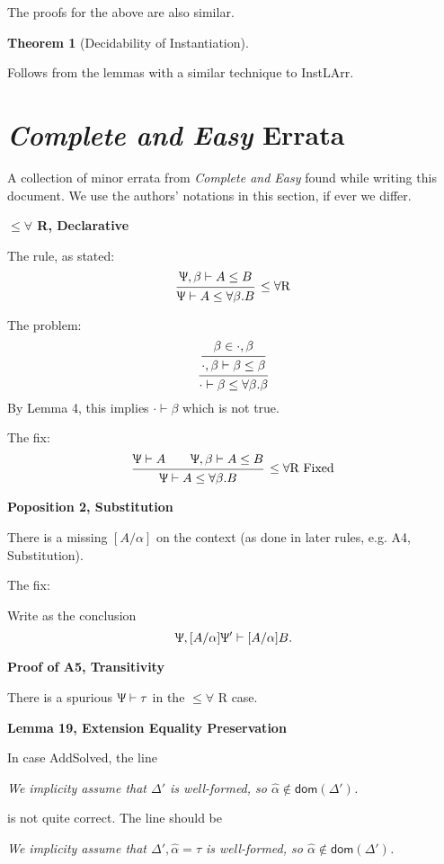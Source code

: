 \documentclass{article}
\newtheorem{thm}{Theorem}
\newcommand{\declCtx}{\Uppsi}
\newcommand{\ev}{\hat}
\newcommand{\spc}{\qquad}
\newcommand{\wf}[2]{#1 \vdash #2}
\newcommand{\subtypes}[3]{#1 \vdash #2 \le #3}
\newcommand{\deduct}[3][]
{
  \begin{prooftree}
    \hypo{#2}
    \infer1[\text{#1}]{#3}
  \end{prooftree}
}
\begin{document}
The proofs for the above are also similar.

\begin{thm}[Decidability of Instantiation]
\end{thm}

Follows from the lemmas with a similar technique to InstLArr.

\section{\emph{Complete and Easy} Errata}

A collection of minor errata from \emph{Complete and Easy} found while writing
this document. We use the authors' notations in this section, if ever we differ.

\textbf{\(\le \forall\) R, Declarative}

The rule, as stated:
\[
  \deduct[\(\le \forall\)R]
  {\subtypes {\declCtx, \beta} A B}
  {\subtypes \declCtx A {\forall \beta. B}}
\]

The problem:
\[
  \begin{prooftree}
    \hypo{\beta \in \cdot, \beta}
    \infer1{\wf{\cdot, \beta}{\beta \le \beta}}
    \infer1{\wf{\cdot}{\beta \le \forall \beta. \beta}}
  \end{prooftree}
\]
By Lemma 4, this implies \(\wf{\cdot}{\beta}\) which is not true.

The fix:
\[
  \deduct[\(\le \forall\)R Fixed]
  {\wf \declCtx A \spc \subtypes {\declCtx, \beta} A B}
  {\subtypes \declCtx A {\forall \beta. B}}
\]

\textbf{Poposition 2, Substitution}

There is a missing \([A/\alpha]\) on the context (as done in later rules, e.g.
A4, Substitution). 

The fix:

Write as the conclusion
\[
  \wf {\declCtx, [A/\alpha]\declCtx'} {[A/\alpha]B}.
\]

\textbf{Proof of A5, Transitivity}

There is a spurious \(\wf \declCtx \tau\) in the \(\le \forall\) R case.

\textbf{Lemma 19, Extension Equality Preservation}

In case AddSolved, the line

\textit{We implicity assume that \(\Delta'\) is well-formed, so \(\ev \alpha \notin
\mathsf{dom}(\Delta')\).}

is not quite correct. The line should be

\textit{We implicity assume that \(\Delta', \ev \alpha = \tau\) is well-formed,
  so \(\ev \alpha \notin \mathsf{dom}(\Delta')\).}
\end{document}
